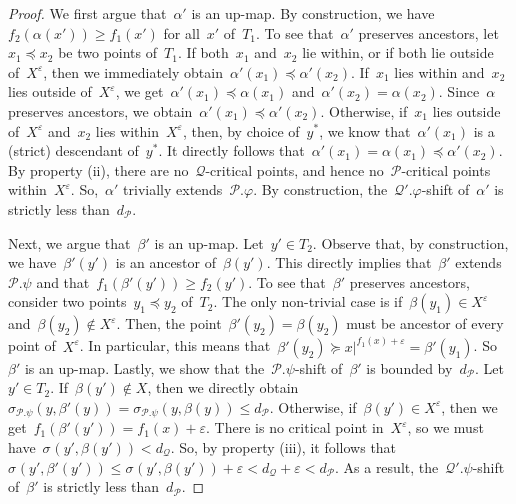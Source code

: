 \documentclass[a4paper,UKenglish, autoref, thm-restate, cleveref]{lipics-v2021}
\newcommand{\an}[2]{#1|^{#2}}
\newcommand{\shift}[1]{\sigma_{#1}}
\newcommand{\resdist}[1]{d_{#1}}
\newcommand{\eps}{\varepsilon}
\renewcommand{\phi}{\varphi}
\renewcommand{\P}{\mathcal{P}}
\newcommand{\Q}{\mathcal{Q}}
\begin{document}
\begin{proof}
    We first argue that~$\alpha'$ is an up-map.
    By construction, we have~$f_2(\alpha(x')) \ge f_1(x')$ for all~$x'$ of~$T_1$.
    To see that~$\alpha'$ preserves ancestors, let~$x_1 \preceq x_2$ be two points of~$T_1$.
    If both~$x_1$ and~$x_2$ lie within, or if both lie outside of~$X^\eps$, then we immediately obtain~$\alpha'(x_1) \preceq \alpha'(x_2)$.
    If~$x_1$ lies within and~$x_2$ lies outside of~$X^\eps$, we get~$\alpha'(x_1) \preceq \alpha(x_1)$ and~$\alpha'(x_2) = \alpha(x_2)$.
    Since~$\alpha$ preserves ancestors, we obtain~$\alpha'(x_1) \preceq \alpha'(x_2)$.
    Otherwise, if~$x_1$ lies outside of~$X^\eps$ and~$x_2$ lies within~$X^\eps$, then, by choice of~$y^*$, we know that~$\alpha'(x_1)$ is a (strict) descendant of~$y^*$.
    It directly follows that~$\alpha'(x_1) = \alpha(x_1) \preceq \alpha'(x_2)$.
    By property (ii), there are no~$\Q$-critical points, and hence no~$\P$-critical points within~$X^\eps$.
    So,~$\alpha'$ trivially extends~$\P.\phi$.
    By construction, the~$\Q'.\phi$-shift of~$\alpha'$ is strictly less than~$\resdist{\P}$.

    Next, we argue that~$\beta'$ is an up-map.
    Let~$y' \in T_2$.
    Observe that, by construction, we have~$\beta'(y')$ is an ancestor of~$\beta(y')$.
    This directly implies that~$\beta'$ extends~$\P.\psi$ and that~$f_1(\beta'(y')) \ge f_2(y')$.
    To see that~$\beta'$ preserves ancestors, consider two points~$y_1 \preceq y_2$ of~$T_2$.
    The only non-trivial case is if~$\beta(y_1) \in X^\eps$ and~$\beta(y_2) \notin X^\eps$.
    Then, the point~$\beta'(y_2) = \beta(y_2)$ must be ancestor of every point of~$X^\eps$.
    In particular, this means that~$\beta'(y_2) \succeq \an{x}{f_1(x)+\eps} = \beta'(y_1)$.
    So~$\beta'$ is an up-map.
    Lastly, we show that the~$\P.\psi$-shift of~$\beta'$ is bounded by~$\resdist{\P}$.
    Let~$y' \in T_2$.
    If~$\beta(y') \notin X$, then we directly obtain~$\shift{\P.\psi}(y, \beta'(y)) = \shift{\P.\psi}(y, \beta(y)) \le \resdist{\P}$. 
    Otherwise, if~$\beta(y') \in X^\eps$, then we get~$f_1(\beta'(y')) = f_1(x) + \eps$.
    There is no critical point in~$X^\eps$, so we must have~$\shift{}(y', \beta(y')) < \resdist{\Q}$.
    So, by property (iii), it follows that~$\shift{}(y', \beta'(y')) \le \shift{}(y', \beta(y')) + \eps < \resdist{\Q} + \eps < \resdist{\P}$.
    As a result, the~$\Q'.\psi$-shift of~$\beta'$ is strictly less than~$\resdist{\P}$.


\end{proof}
\end{document}
